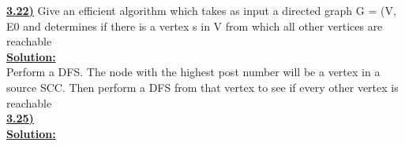 \documentclass{article}
\begin{document}
\vspace{.2in}
\noindent \textbf{\underline{3.22)}} Give an efficient algorithm which takes as input a directed graph G = (V, E0 and determines if there is a vertex s in V from which all other vertices are reachable \\

\noindent \textbf{\underline{Solution:}}  \\
Perform a DFS. The node with the highest post number will be a vertex in a source SCC. Then perform a DFS from that vertex to see if every other vertex is reachable \\ 

\vspace{.2in}
\noindent \textbf{\underline{3.25)}} \\

\noindent \textbf{\underline{Solution:}}  \\
\end{document}
